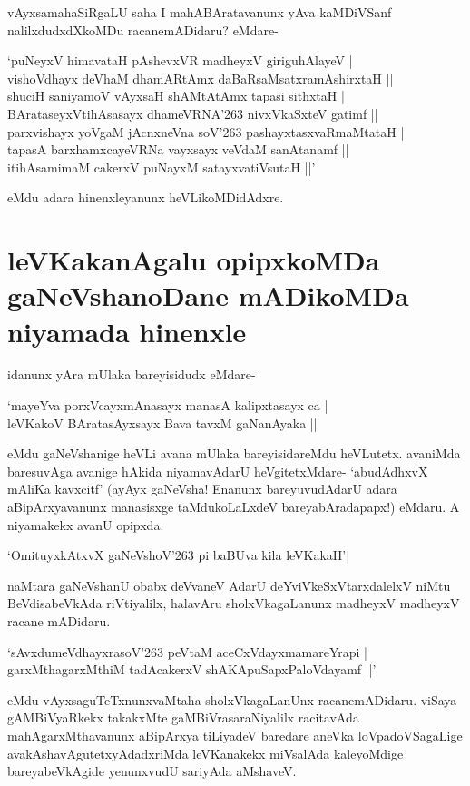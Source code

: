 vAyxsamahaSiRgaLU saha I mahABAratavanunx yAva kaMDiVSanf nalilxdudxdXkoMDu racanemADidaru? eMdare-

\begin{shloka}
`puNeyxV himavataH pAshevxVR madheyxV giriguhAlayeV |\label{118b}\\
vishoVdhayx deVhaM dhamARtAmx daBaRsaMsatxramAshirxtaH ||\\
shuciH saniyamoV vAyxsaH shAMtAtAmx tapasi sithxtaH |\\
BArataseyxVtihAsasayx dhameVRNA\char'263 nivxVkaSxteV gatimf ||\\
parxvishayx yoVgaM jAcnxneVna soV\char'263 pashayxtasxvaRmaMtataH |\\
tapasA barxhamxcayeVRNa vayxsayx veVdaM sanAtanamf ||\\
itihAsamimaM cakerxV puNayxM satayxvatiVsutaH ||'
\end{shloka}
eMdu adara hinenxleyanunx heVLikoMDidAdxre.

\section*{leVKakanAgalu opipxkoMDa gaNeVshanoDane mADikoMDa niyamada hinenxle}

idanunx yAra mUlaka bareyisidudx eMdare-

\begin{shloka}
`mayeYva porxVcayxmAnasayx manasA kalipxtasayx ca |\label{119c}\\
leVKakoV BAratasAyxsayx Bava tavxM gaNanAyaka ||
\end{shloka}

eMdu gaNeVshanige heVLi avana mUlaka bareyisidareMdu heVLutetx. avaniMda baresuvAga avanige hAkida niyamavAdarU heVgitetxMdare- `abudAdhxvX mAliKa kavxcitf'\label{119a} (ayAyx gaNeVsha! Enanunx bareyuvudAdarU adara aBipArxyavanunx manasisxge taMdukoLaLxdeV bareyabAradapapx!) eMdaru. A niyamakekx avanU opipxda.

\begin{shloka}
`OmituyxkAtxvX gaNeVshoV\char'263 pi baBUva kila leVKakaH'|\label{119b}
\end{shloka}

naMtara gaNeVshanU obabx deVvaneV AdarU deYviVkeSxVtarxdalelxV niMtu BeVdisabeVkAda riVtiyalilx, halavAru sholxVkagaLanunx madheyxV madheyxV racane mADidaru. 

\begin{shloka}
`sAvxdumeVdhayxrasoV\char'263 peVtaM aceCxVdayxmamareYrapi |\label{119d}\\
garxMthagarxMthiM tadAcakerxV shAKApuSapxPaloVdayamf ||'\label{119}
\end{shloka}
eMdu vAyxsaguTeTxnunxvaMtaha sholxVkagaLanUnx racanemADidaru. viSaya gAMBiVyaRkekx takakxMte gaMBiVrasaraNiyalilx racitavAda mahAgarxMthavanunx aBipArxya tiLiyadeV baredare aneVka loVpadoVSagaLige avakAshavAgutetxyAdadxriMda leVKanakekx miVsalAda kaleyoMdige bareyabeVkAgide yenunxvudU sariyAda aMshaveV.

